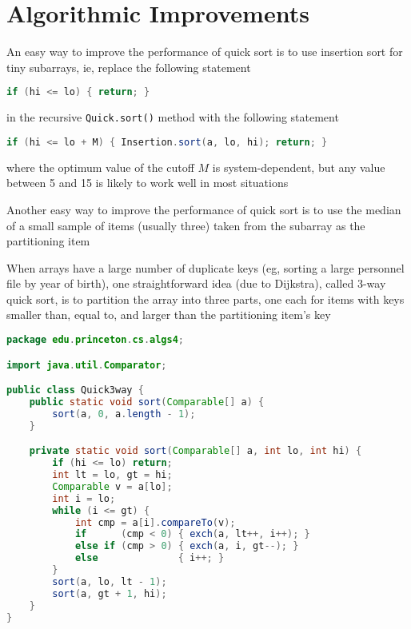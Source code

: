 \documentclass[8pt,a4paper,compress]{beamer}
\begin{document}
\section{Algorithmic Improvements}
\begin{frame}[fragile]
\pause

An easy way to improve the performance of quick sort is to use insertion sort for tiny subarrays, ie, replace the following statement 

\smallskip

\begin{lstlisting}[language=Java,style=focusin]
if (hi <= lo) { return; }
\end{lstlisting}

\smallskip

in the recursive \lstinline{Quick.sort()} method with the following statement

\smallskip

\begin{lstlisting}[language=Java,style=focusin]
if (hi <= lo + M) { Insertion.sort(a, lo, hi); return; }
\end{lstlisting}

\smallskip

where the optimum value of the cutoff $M$ is system-dependent, but any value between 5 and 15 is likely to work well in most situations

\pause
\bigskip

Another easy way to improve the performance of quick sort is to use the median of a small sample of items (usually three) taken from the subarray as the partitioning item
\end{frame}

\begin{frame}[fragile]
\pause

When arrays have a large number of duplicate keys (eg, sorting a large personnel file by year of birth), one straightforward idea (due to Dijkstra), called 3-way quick sort, is to partition the array into three parts, one each for items with keys smaller than, equal to, and larger than the partitioning item's key

\pause\bigskip

\begin{lstlisting}[language=Java,style=focusin]
package edu.princeton.cs.algs4;

import java.util.Comparator;

public class Quick3way {
    public static void sort(Comparable[] a) {
        sort(a, 0, a.length - 1);
    }

    private static void sort(Comparable[] a, int lo, int hi) { 
        if (hi <= lo) return;
        int lt = lo, gt = hi;
        Comparable v = a[lo];
        int i = lo;
        while (i <= gt) {
            int cmp = a[i].compareTo(v);
            if      (cmp < 0) { exch(a, lt++, i++); }
            else if (cmp > 0) { exch(a, i, gt--); }
            else              { i++; }
        }
        sort(a, lo, lt - 1);
        sort(a, gt + 1, hi);
    }
}
\end{lstlisting}
\end{frame}
\end{document}
